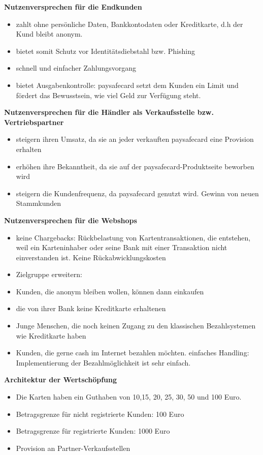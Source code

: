 \textbf{Nutzenversprechen für die Endkunden}
\begin{itemize}
        \item zahlt ohne persönliche Daten, Bankkontodaten oder Kreditkarte, d.h der Kund bleibt anonym.
        \item bietet somit Schutz vor Identitätsdiebstahl bzw. Phishing
        \item schnell und einfacher Zahlungsvorgang
        \item bietet Ausgabenkontrolle: paysafecard setzt dem Kunden ein Limit und fördert das Bewusstsein, wie viel Geld zur Verfügung steht.
\end{itemize}


\textbf{Nutzenversprechen für die Händler als Verkaufsstelle bzw. Vertriebspartner}
\begin{itemize}
        \item steigern ihren Umsatz, da sie an jeder verkauften paysafecard eine Provision erhalten
        \item erhöhen ihre Bekanntheit, da sie auf der paysafecard-Produktseite beworben wird
        \item steigern die Kundenfrequenz, da paysafecard genutzt wird. Gewinn von neuen Stammkunden
\end{itemize}

\textbf{Nutzenversprechen für die Webshops}
\begin{itemize}
        \item keine Chargebacks: Rückbelastung von Kartentransaktionen, die entstehen, weil ein Karteninhaber oder seine Bank mit einer Transaktion nicht einverstanden ist. Keine Rückabwicklungskosten
        \item Zielgruppe erweitern:
        \item   Kunden, die anonym bleiben wollen, können dann einkaufen
        \item   die von ihrer Bank keine Kreditkarte erhaltenen
        \item   Junge Menschen, die noch keinen Zugang zu den klassischen Bezahlsystemen wie Kreditkarte haben
        \item   Kunden, die gerne cash im Internet bezahlen möchten.
einfaches Handling: Implementierung der Bezahlmöglichkeit ist sehr einfach.
\end{itemize}

\textbf{Architektur der Wertschöpfung}
\begin{itemize}
        \item Die Karten haben ein Guthaben von 10,15, 20, 25, 30, 50 und 100 Euro.
        \item Betragsgrenze für nicht registrierte Kunden: 100 Euro
        \item Betragsgrenze für registrierte Kunden: 1000 Euro
        \item Provision an Partner-Verkaufsstellen
\end{itemize}


